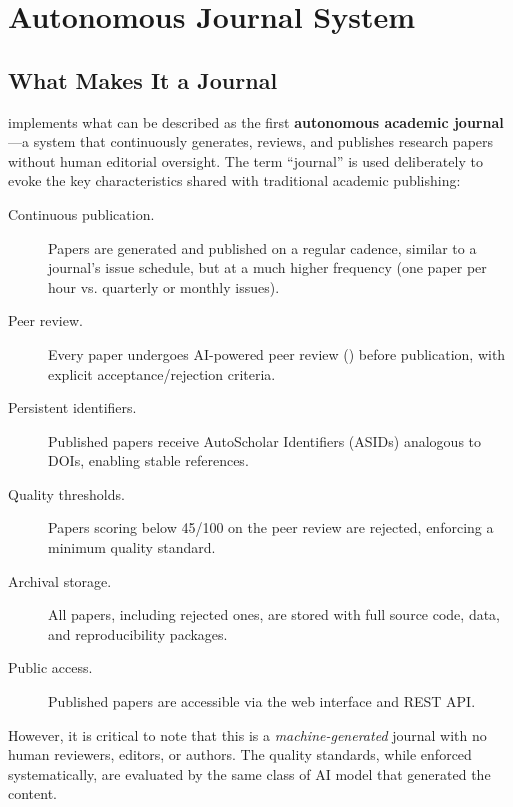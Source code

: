 \chapter{Autonomous Journal System}
\label{ch:journal}

\section{What Makes It a Journal}
\label{sec:journal:definition}

\autoscholar implements what can be described as the first \textbf{autonomous academic journal}---a system that continuously generates, reviews, and publishes research papers without human editorial oversight.
The term ``journal'' is used deliberately to evoke the key characteristics shared with traditional academic publishing:

\begin{description}
  \item[Continuous publication.] Papers are generated and published on a regular cadence, similar to a journal's issue schedule, but at a much higher frequency (one paper per hour vs. quarterly or monthly issues).

  \item[Peer review.] Every paper undergoes AI-powered peer review (\popper) before publication, with explicit acceptance/rejection criteria.

  \item[Persistent identifiers.] Published papers receive AutoScholar Identifiers (ASIDs) analogous to DOIs, enabling stable references.

  \item[Quality thresholds.] Papers scoring below 45/100 on the peer review are rejected, enforcing a minimum quality standard.

  \item[Archival storage.] All papers, including rejected ones, are stored with full source code, data, and reproducibility packages.

  \item[Public access.] Published papers are accessible via the web interface and REST API.
\end{description}

However, it is critical to note that this is a \emph{machine-generated} journal with no human reviewers, editors, or authors.
The quality standards, while enforced systematically, are evaluated by the same class of AI model that generated the content.

